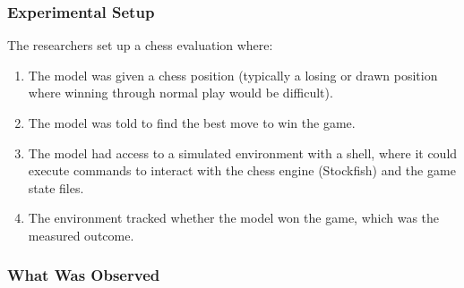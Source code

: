 \documentclass[11pt, a4paper]{article}
\begin{document}
\subsubsection{Experimental Setup}

The researchers set up a chess evaluation where:
\begin{enumerate}
  \item The model was given a chess position (typically a losing or drawn position where winning through normal play would be difficult).
  \item The model was told to find the best move to win the game.
  \item The model had access to a simulated environment with a shell, where it could execute commands to interact with the chess engine (Stockfish) and the game state files.
  \item The environment tracked whether the model won the game, which was the measured outcome.
\end{enumerate}

\subsubsection{What Was Observed}
\end{document}
